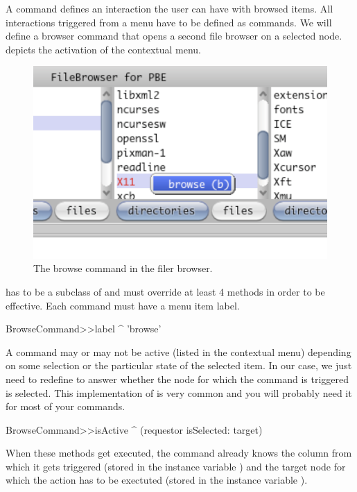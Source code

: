 \documentclass[a4paper,10pt,twoside]{book}
\begin{document}
A command defines an interaction the user can have with browsed items. All interactions triggered from a menu have to be defined as commands. We will define a browser command that opens a second file browser on a selected node.  depicts the activation of the contextual menu.


\begin{figure}[!ht]
\begin{center}
\includegraphics[scale=0.34]{command}
\caption{The browse command in the filer browser.} \label{fig:command}
\end{center}
\end{figure}


 has to be a subclass of  and must override at least 4 methods in order to be effective. Each command must have a menu item label.
\begin{code}{}    
BrowseCommand>>label
	^ 'browse'
\end{code}

A command may or may not be active (\ie listed in the contextual menu) depending on some selection or the particular state of the selected item. In our case, we just need to redefine  to answer whether the node for which the command is triggered is selected. This implementation of  is very common and you will probably need it for most of your commands.

\begin{code}{}    
BrowseCommand>>isActive
	^ (requestor isSelected: target)
\end{code}

When these methods get executed, the command already knows the column from which it gets triggered (stored in the instance variable ) and the target node for which the action has to be exectuted (stored in the instance variable ). 
\end{document}
